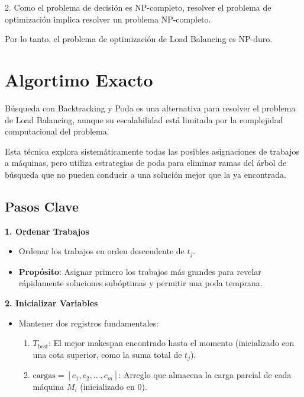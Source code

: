 \documentclass{report}
\begin{document}
	2. Como el problema de decisión es NP-completo, resolver el problema de optimización implica resolver un problema NP-completo.
	
	Por lo tanto, el problema de optimización de Load Balancing es NP-duro.
	
		\section{Algortimo Exacto}
		Búsqueda con Backtracking y Poda es una alternativa para resolver el problema de Load Balancing, aunque su escalabilidad está limitada por la complejidad computacional del problema.

		Esta técnica explora sistemáticamente todas las posibles asignaciones de trabajos a máquinas, pero utiliza estrategias de poda para eliminar ramas del árbol de búsqueda que no pueden conducir a una solución mejor que la ya encontrada.

		\subsection*{Pasos Clave}

		\textbf{1. Ordenar Trabajos}
		\begin{itemize}
			\item Ordenar los trabajos en orden descendente de \( t_j \). 
			\item \textbf{Propósito}: Asignar primero los trabajos más grandes para revelar rápidamente soluciones subóptimas y permitir una poda temprana.
		\end{itemize}

		\textbf{2. Inicializar Variables}
		\begin{itemize}
			\item Mantener dos registros fundamentales:
			\begin{enumerate}
				\item \( T_{\text{best}} \): El mejor makespan encontrado hasta el momento (inicializado con una cota superior, como la suma total de \( t_j \)).
				\item \( \text{cargas} = [c_1, c_2, \dots, c_m] \): Arreglo que almacena la carga parcial de cada máquina \( M_i \) (inicializado en 0).
			\end{enumerate}
		\end{itemize}
\end{document}
